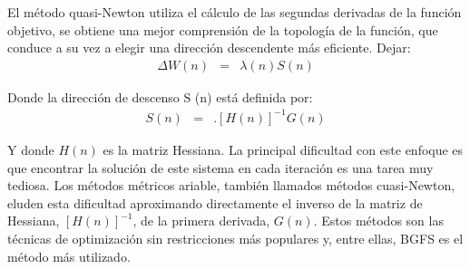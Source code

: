 

El método quasi-Newton utiliza el cálculo de las segundas derivadas de la función objetivo, se obtiene una mejor comprensión de la topología de la función, que conduce a su vez a elegir una dirección descendente más eficiente. Dejar:
\begin{eqnarray}
	\Delta W(n) &=& \lambda(n)S(n)
\end{eqnarray}

Donde la dirección de descenso S (n) está definida por:
\begin{eqnarray}
	S(n) &=& .[H(n)]^{-1}G(n)
\end{eqnarray}

Y donde $H(n)$ es la matriz Hessiana. La principal dificultad con este enfoque es que encontrar la solución de este sistema en cada iteración es una tarea muy tediosa. Los métodos métricos ariable, también llamados métodos cuasi-Newton, eluden esta dificultad aproximando directamente el inverso de la matriz de Hessiana, $[H(n)]^{-1}$, de la primera derivada, $G(n)$. Estos métodos son las técnicas de optimización sin restricciones más populares y, entre ellas, BGFS es el método más utilizado.%




